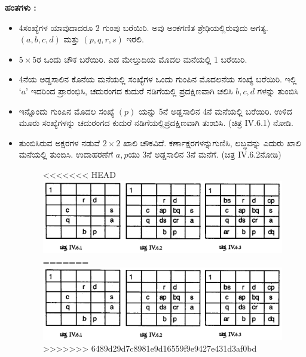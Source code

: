 \textbf{ಹಂತಗಳು :}
\begin{itemize}
	\item 4ಸಂಖ್ಯೆಗಳ ಯಾವುದಾದರೂ 2 ಗುಂಪು ಬರೆಯಿರಿ. ಅವು ಅಂಕಗಣಿತ ಶ್ರೇಢಿಯಲ್ಲಿರುವುದು ಅಗತ್ಯ. $(a, b, c, d)$ ಮತ್ತು $(p, q, r, s)$ ಇರಲಿ.
	\item $5 \times 5$ರ ಒಂದು ಚೌಕ ಬರೆಯಿರಿ. ಎಡ ಮೇಲ್ತುದಿಯ ಮೊದಲ ಮನೆಯಲ್ಲಿ 1 ಬರೆಯಿರಿ.
	\item 4ನೆಯ ಅಡ್ಡಸಾಲಿನ ಕೊನೆಯ ಮನೆಯಲ್ಲಿ ಸಂಖ್ಯೆಗಳ ಒಂದು ಗುಂಪಿನ ಮೊದಲನೆಯ ಸಂಖ್ಯೆ ಬರೆಯಿರಿ. ಇಲ್ಲಿ $‘a’$ ಇದರಿಂದ ಪ್ರಾರಂಭಿಸಿ, ಚದುರಂಗದ ಕುದುರೆ ನಡಿಗೆಯಲ್ಲಿ ಪ್ರದಕ್ಷಿಣವಾಗಿ ಚಲಿಸಿ $b, c, d$ ಗಳನ್ನು ತುಂಬಿಸಿ
	\item ಇನ್ನೊಂದು ಗುಂಪಿನ ಮೊದಲ ಸಂಖ್ಯೆ $(p)$ ಯನ್ನು 5ನೆ ಅಡ್ಡಸಾಲಿನ 4ನೆ ಮನೆ\-ಯಲ್ಲಿ ಬರೆಯಿರಿ. ಉಳಿದ ಮೂರು ಸಂಖ್ಯೆಗಳನ್ನು ಚದುರಂಗದ ಕುದುರೆ ನಡಿಗೆಯಲ್ಲಿ\break ಪ್ರದಕ್ಷಿಣವಾಗಿ ತುಂಬಿಸಿ. (ಚಿತ್ರ IV.6.1) ನೋಡಿ.
	\item ತುಂಬಿಸಿರುವ ಅಕ್ಷರಗಳ ನಡುವೆ $2 \times 2$ ಖಾಲಿ ಚೌಕವಿದೆ. ಕರ್ಣಾಕ್ಷರಗಳನ್ನು\break ಗುಣಿಸಿ, ಲಬ್ಧವನ್ನು ಎದುರು ಖಾಲಿ ಮನೆಯಲ್ಲಿ ತುಂಬಿಸಿ. ಉದಾಹರಣೆಗೆ $a, p$ಯು  3ನೆ ಅಡ್ಡಸಾಲಿನ 3ನೆ ಮನೆಗೆ. (ಚಿತ್ರ IV.6.2ನೋಡಿ)
	\begin{figure}[H]
<<<<<<< HEAD
	\includegraphics[scale=.8]{src/figures/chap7/fig7-28.jpg}
=======
	\includegraphics[scale=.75]{src/figures/chap7/fig7.28.jpg}
>>>>>>> 6489d29d7c8981e9d16559f9e9427e431d3af0bd
	\end{figure}


\end{itemize}

